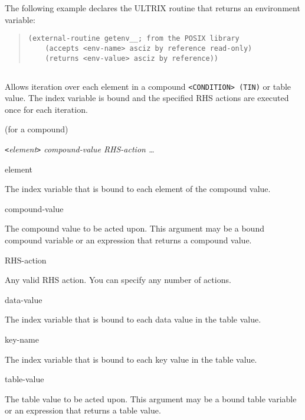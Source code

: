 The following example declares the ULTRIX routine that
returns an environment variable:

\begin{quote}
\begin{verbatim}
(external-routine getenv__; from the POSIX library
    (accepts <env-name> asciz by reference read-only)
    (returns <env-value> asciz by reference))
\end{verbatim}
\end{quote}

\subsection{}

Allows iteration over each element in a compound
\verb|<CONDITION> (TIN)| or table value. The index variable is bound
and the specified RHS actions are executed once for each iteration.

\Format (for a compound)

 \verb|<|\it{element}\verb|>|  \it{compound-value}
\it{RHS-action} \ldots

\begin{arguments}
\item[\co{<}element\co{>}]

  The index variable that is bound to each element of the compound
  value.

\item[compound-value]

  The compound value to be acted upon. This argument may be a bound
  compound variable or an expression that returns a compound value.

\item[RHS-action]

  Any valid RHS action. You can specify any number of actions.

\item[\co{<}data-value\co{>}]

  The index variable that is bound to each data value in the table
  value.

\item[\co{<}key-name\co{>}]

  The index variable that is bound to each key value in the table
  value.

\item[table-value]

  The table value to be acted upon. This argument may be a bound table
  variable or an expression that returns a table value.
\end{arguments}

